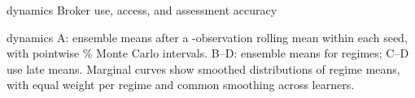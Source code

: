 \begin{ptitle}{dynamics}
Broker use, access, and assessment accuracy
\end{ptitle}
\begin{pcaption}{dynamics}
A: ensemble means after a -observation rolling mean within each seed, with pointwise \% Monte Carlo intervals. B--D: ensemble means for  regimes; C--D use late means. Marginal curves show smoothed distributions of regime means, with equal weight per regime and common smoothing across learners.
\end{pcaption}
